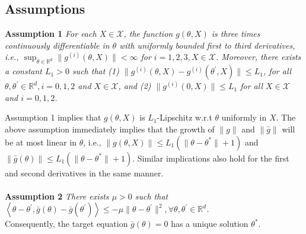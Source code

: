 \documentclass[a4paper]{article}
\newcommand{\norm}[1]{\|#1 \|}
\newcommand{\thetastar}{\theta^*}
\begin{document}
	\subsection{Assumptions}
	\textbf{Assumption 1} \textit{
		For each $X \in \mathcal{X}$, the function $g\left(\theta, X\right)$ is three times continuously differentiable in $\theta$ with uniformly bounded first to third derivatives, i.e., $\sup_{\theta \in \mathbb{R}^{d}}\norm{g^{(i)}\left(\theta, X\right)} < \infty$ for $i = 1, 2, 3, X \in \mathcal{X}$. Moreover, there exists a constant $L_{1} > 0$ such that (1) $\norm{g^{(i)}\left(\theta, X\right) - g^{(i)}\left(\theta^{\prime}, X\right)} \le L_{1}$, for all $\theta, \theta^{\prime} \in \mathbb{R}^{d}, i = 0, 1, 2$ and $X \in \mathcal{X}$, and (2) $\norm{g^{(i)}\left(0, X\right)} \le L_{1}$ for all $X \in \mathcal{X}$ and $i = 0, 1, 2$.
	}
	
	Assumption 1 implies that $g\left(\theta, X\right)$ is $L_{1}$-Lipschitz w.r.t $\theta$ uniformly in $X$. The above assumption immediately implies that the growth of $\norm{g}$ and $\norm{\bar{g}}$ will be at most linear in $\theta$, i.e., $\norm{g\left(\theta, X\right)} \le L_{1}\left(\norm{\theta - \thetastar} + 1\right)$ and $\norm{\bar{g}\left(\theta\right)} \le L_{1}\left(\norm{\theta - \thetastar} + 1\right)$. Similar implications also hold for the first and second derivatives in the same manner.
	\\
	\\
	\textbf{Assumption 2} \textit{
		There exists $\mu > 0$ such that $\left\langle \theta - \theta^{\prime}, \bar{g}(\theta) - \bar{g}(\theta^{\prime}) \right\rangle \le -\mu\norm{\theta - \theta^{\prime}}^{2}, \forall \theta, \theta^{\prime} \in \mathbb{R}^{d}$.
	}
	\\
	Consequently, the target equation $\bar{g}(\theta) = 0$ has a unique solution $\thetastar$.
	\\
	
\end{document}
